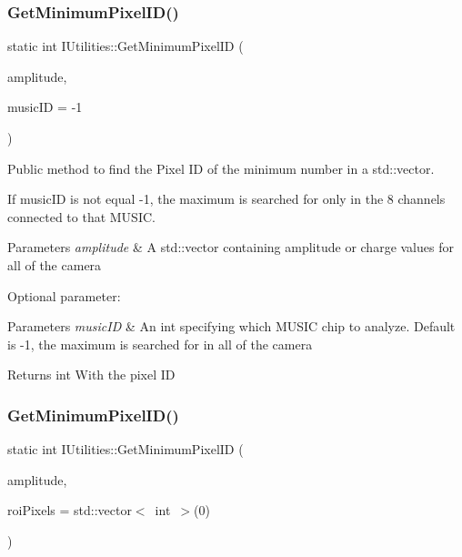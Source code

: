 \subsubsection{\texorpdfstring{Get\+Minimum\+Pixel\+I\+D()}{GetMinimumPixelID()}\hspace{0.1cm}{\footnotesize\ttfamily [1/2]}}
{\footnotesize\ttfamily static int I\+Utilities\+::\+Get\+Minimum\+Pixel\+ID (\begin{DoxyParamCaption}\item[{std\+::vector$<$ float $>$}]{amplitude,  }\item[{int}]{music\+ID = {\ttfamily -\/1} }\end{DoxyParamCaption})\hspace{0.3cm}{\ttfamily [static]}}



Public method to find the Pixel ID of the minimum number in a std\+::vector. 

If music\+ID is not equal -\/1, the maximum is searched for only in the 8 channels connected to that M\+U\+S\+IC.


\begin{DoxyParams}{Parameters}
{\em amplitude} & A std\+::vector containing amplitude or charge values for all of the camera\\
\hline
\end{DoxyParams}
Optional parameter\+: 
\begin{DoxyParams}{Parameters}
{\em music\+ID} & An int specifying which M\+U\+S\+IC chip to analyze. Default is -\/1, the maximum is searched for in all of the camera\\
\hline
\end{DoxyParams}
\begin{DoxyReturn}{Returns}
int With the pixel ID 
\end{DoxyReturn}
\mbox{\label{classIUtilities_a2e1fadb4432d146d004d747af2ab447b}} 
\subsubsection{\texorpdfstring{Get\+Minimum\+Pixel\+I\+D()}{GetMinimumPixelID()}\hspace{0.1cm}{\footnotesize\ttfamily [2/2]}}
{\footnotesize\ttfamily static int I\+Utilities\+::\+Get\+Minimum\+Pixel\+ID (\begin{DoxyParamCaption}\item[{std\+::vector$<$ float $>$}]{amplitude,  }\item[{std\+::vector$<$ int $>$}]{roi\+Pixels = {\ttfamily std\+:\+:vector$<$~int~$>$(0)} }\end{DoxyParamCaption})\hspace{0.3cm}{\ttfamily [static]}}



